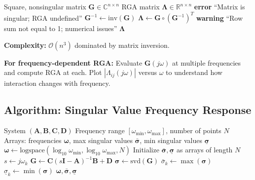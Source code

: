 \begin{algorithm}[H]
\caption{Relative Gain Array Computation}
\label{alg:rga}
\begin{algorithmic}[1]
\REQUIRE Square, nonsingular matrix $\mathbf{G} \in \mathbb{C}^{n \times n}$
\ENSURE RGA matrix $\boldsymbol{\Lambda} \in \mathbb{R}^{n \times n}$
\STATE
{}
    \STATE \textbf{error} ``Matrix is singular; RGA undefined''
\ENDIF
\STATE
{}
\STATE $\mathbf{G}^{-1} \gets \text{inv}(\mathbf{G})$
\STATE
{}
\STATE $\boldsymbol{\Lambda} \gets \mathbf{G} \circ (\mathbf{G}^{-1})^T$ 
\STATE
{}
        \STATE \textbf{warning} ``Row sum not equal to 1; numerical issues''
    \ENDIF
\ENDFOR
\STATE
\RETURN $\boldsymbol{\Lambda}$
\end{algorithmic}
\end{algorithm}

\textbf{Complexity:} $\mathcal{O}(n^3)$ dominated by matrix inversion.

\textbf{For frequency-dependent RGA:} Evaluate $\mathbf{G}(j\omega)$ at multiple frequencies and compute RGA at each. Plot $|\Lambda_{ij}(j\omega)|$ versus $\omega$ to understand how interaction changes with frequency.


\subsection{Algorithm: Singular Value Frequency Response}

\begin{algorithm}[H]
\caption{Singular Value Bode Plot}
\label{alg:sv_bode}
\begin{algorithmic}[1]
\REQUIRE System $(\mathbf{A}, \mathbf{B}, \mathbf{C}, \mathbf{D})$
\REQUIRE Frequency range $[\omega_{\min}, \omega_{\max}]$, number of points $N$
\ENSURE Arrays: frequencies $\boldsymbol{\omega}$, max singular values $\bar{\boldsymbol{\sigma}}$, min singular values $\underline{\boldsymbol{\sigma}}$
\STATE
\STATE $\boldsymbol{\omega} \gets \text{logspace}(\log_{10}\omega_{\min}, \log_{10}\omega_{\max}, N)$
\STATE Initialize $\bar{\boldsymbol{\sigma}}, \underline{\boldsymbol{\sigma}}$ as arrays of length $N$
\STATE
{}
    \STATE $s \gets j\omega_k$
    \STATE $\mathbf{G} \gets \mathbf{C}(s\mathbf{I} - \mathbf{A})^{-1}\mathbf{B} + \mathbf{D}$
    \STATE $\boldsymbol{\sigma} \gets \text{svd}(\mathbf{G})$ 
    \STATE $\bar{\sigma}_k \gets \max(\boldsymbol{\sigma})$
    \STATE $\underline{\sigma}_k \gets \min(\boldsymbol{\sigma})$
\ENDFOR
\STATE
\RETURN $\boldsymbol{\omega}, \bar{\boldsymbol{\sigma}}, \underline{\boldsymbol{\sigma}}$
\end{algorithmic}
\end{algorithm}

